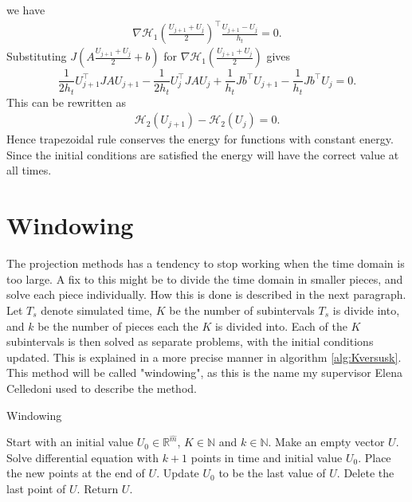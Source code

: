 \noindent we have
\begin{equation*}
\begin{aligned}
\nabla \mathcal{H}_1 (\frac{U_{j+1}  + U_j}{2}) ^\top \frac{U_{j+1} - U_j}{ h_t } = 0.
\end{aligned}
\end{equation*}
\noindent Substituting $ J (A\frac{U_{j+1}  + U_j}{2}  + b) $ for $\nabla \mathcal{H}_1 (\frac{U_{j+1}  + U_j}{2})$ gives
\begin{equation*}
\frac{1}{2 h_t} U_{j+1}^\top JAU_{j+1} %
- \frac{1}{2 h_t} U_{j}^\top JAU_{j} + \frac{1}{h_t} Jb^\top U_{j+1} -\frac{1}{h_t} Jb^\top U_{j} = 0.
\end{equation*}
This can be rewritten as
\begin{equation*}
\begin{aligned}
\mathcal{H}_2(U_{j+1}) - \mathcal{H}_2(U_{j}) = 0.
\end{aligned}
\end{equation*}
\noindent Hence trapezoidal rule conserves the energy for functions with constant energy. Since the initial conditions are satisfied the energy will have the correct value at all times.

\section{Windowing}%
\noindent The projection methods has a tendency to stop working when the time domain is too large. A fix to this might be to divide the time domain in smaller pieces, and solve each piece individually. How this is done is described in the next paragraph.\\ 

\noindent Let $T_s$ denote simulated time, $K$ be the number of subintervals $T_s$ is divide into, and $k$ be the number of pieces each the $K$ is divided into. Each of the $K$ subintervals is then solved as separate problems, with the initial conditions updated. This is explained in a more precise manner in algorithm \ref{alg:Kversusk}. This method will be called "windowing", as this is the name my supervisor Elena Celledoni \cite{elenaperson} used to describe the method.

\begin{algorithm} [h!]
\begin{algorithmic} \caption{ Windowing } \label{alg:Kversusk}  
\STATE Start with an initial value $U_0 \in \mathbb{R}^{\hat{m}}$, $K \in \mathbb{N}$ and $k \in \mathbb{N}$.
\STATE Make an empty vector $U$.
   \STATE Solve differential equation with $k+1$ points in time and initial value $U_0$.
   \STATE Place the new points at the end of $U$.
   \STATE Update $U_0$ to be the last value of $U$.
   \STATE Delete the last point of $U$.
\ENDFOR
\STATE Return $U$.
\end{algorithmic} 
\end{algorithm}

